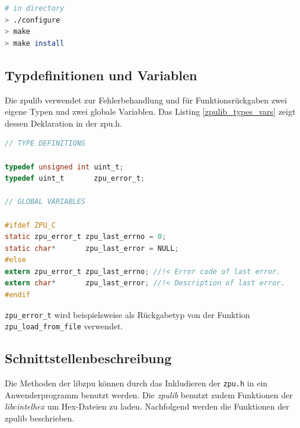 \documentclass[11pt]{scrartcl}
\begin{document}
\begin{lstlisting}[language=bash,caption=Installation der zpulib-Bibliothek]
# in directory
> ./configure
> make
> make install
\end{lstlisting}

\subsection{Typdefinitionen und Variablen}

Die zpulib verwendet zur Fehlerbehandlung und für Funktionsrückgaben zwei eigene Typen und zwei globale Variablen. Das Listing \ref{zpulib_types_vars} zeigt dessen Deklaration in der zpu.h.

\begin{lstlisting}[language=C,firstnumber=28,caption=zpulib Typen und Variblen,label=zpulib_types_vars]
// TYPE DEFINITIONS

typedef unsigned int uint_t;
typedef uint_t       zpu_error_t;

// GLOBAL VARIABLES

#ifdef ZPU_C
static zpu_error_t zpu_last_errno = 0;
static char*       zpu_last_error = NULL;
#else
extern zpu_error_t zpu_last_errno; //!< Error code of last error.
extern char*       zpu_last_error; //!< Description of last error.
#endif

\end{lstlisting}

\texttt{zpu\_error\_t} wird beispielsweise als Rückgabetyp von der Funktion \texttt{zpu\_load\_from\_file} verwendet. 

\subsection{Schnittstellenbeschreibung}
Die Methoden der libzpu können durch das Inkludieren der \texttt{zpu.h} in ein Anwenderprogramm benutzt werden. Die \textit{zpulib} benutzt zudem Funktionen der \textit{libcintelhex} um Hex-Dateien zu laden. Nachfolgend werden die Funktionen der zpulib beschrieben.
\end{document}
